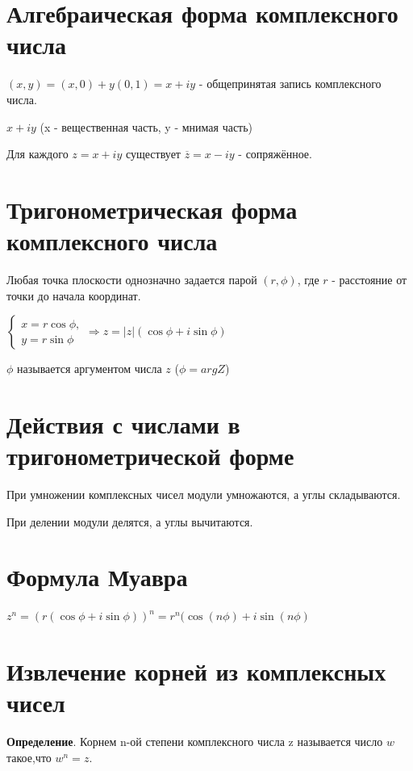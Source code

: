 \documentclass[a4paper]{article}
\begin{document}
{\begin{small}
\begin{itemize}
		
\end{itemize}


\section*{Алгебраическая форма комплексного числа}
$(x,y) = (x,0) + y(0,1) = x+iy$ - общепринятая запись комплексного числа.

$x+iy$ (x - вещественная часть, y - мнимая часть)

Для каждого $z = x+iy$ существует $\overline{z} = x-iy$ - сопряжённое.


\section*{Тригонометрическая форма комплексного числа}

Любая точка плоскости однозначно задается парой $(r, \phi)$, где $r$ - расстояние от точки до начала координат.

$\displaystyle \begin{cases}
x = r \cos \phi,
\\
y = r \sin \phi
\end{cases} \Rightarrow z = |z| (\cos \phi + i \sin \phi)$

$\phi$ называется аргументом числа $z$ ($\phi = argZ$)

\section*{Действия с числами в тригонометрической форме}

При умножении комплексных чисел модули умножаются, а углы складываются.

При делении модули делятся, а углы вычитаются.



\section*{Формула Муавра}
 $z^n = (r(\cos \phi + i \sin \phi))^n = r^n ( \cos(n \phi) + i \sin(n \phi)$

\section*{Извлечение корней из комплексных чисел
}
\textbf{Определение}. Корнем n-ой степени комплексного числа z называется число $w$ такое,\newline что $w^n = z$.



\end{small}}
\end{document}
